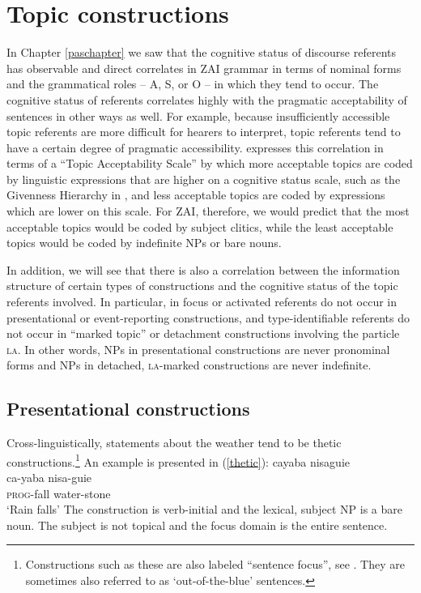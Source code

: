\section{Topic constructions}\label{topicconstructionssection}


In Chapter \ref{paschapter} we saw that the cognitive status of discourse referents has observable and direct correlates in ZAI grammar in terms of nominal forms and the grammatical roles -- A, S, or O -- in which they tend to occur. The cognitive status of referents correlates highly with the pragmatic acceptability of sentences in other ways as well. For example, because insufficiently accessible topic referents are more difficult for hearers to interpret, topic referents tend to have a certain degree of pragmatic accessibility. \citet[165]{lambrecht1994} expresses this correlation in terms of a ``Topic Acceptability Scale'' by which more acceptable topics are coded by linguistic expressions that are higher on a cognitive status scale, such as the Givenness Hierarchy in , and less acceptable topics are coded by expressions which are lower on this scale. For ZAI, therefore, we would predict that the most acceptable topics would be coded by subject clitics, while the least acceptable topics would be coded by indefinite NPs or bare nouns.

In addition, we will see that there is also a correlation between the information structure of certain types of constructions and the cognitive status of the topic referents involved. In particular, in focus or activated referents do not occur in presentational or event-reporting constructions, and type-identifiable referents do not occur in ``marked topic'' or detachment constructions involving the particle \textsc{la}. In other words, NPs in presentational constructions are never pronominal forms and NPs in detached, \textsc{la}-marked constructions are never indefinite. 



\subsection{Presentational constructions}\label{presentationalsection}

Cross-linguistically, statements about the weather tend to be thetic constructions.\footnote{Constructions such as these are also labeled ``sentence focus'', see . They are sometimes also referred to as `out-of-the-blue' sentences.} An example is presented in (\ref{thetic}):
\ea\label{thetic} 
\glll cayaba nisaguie \\
ca-yaba nisa-guie \\
\textsc{prog}-fall water-stone  \\
\glt `Rain falls' 
\z
The construction is verb-initial and the lexical, subject NP is a bare noun. The subject is not topical and the focus domain is the entire sentence.

